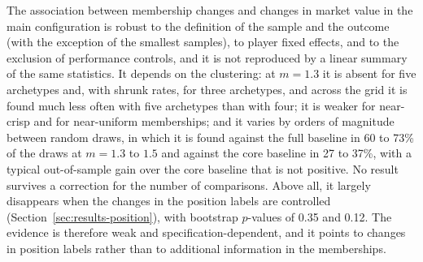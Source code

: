 The association between membership changes and changes in market value in the main configuration is robust to the definition of the sample and the outcome (with the exception of the smallest samples), to player fixed effects, and to the exclusion of performance controls, and it is not reproduced by a linear summary of the same statistics. It depends on the clustering: at $m=1.3$ it is absent for five archetypes and, with shrunk rates, for three archetypes, and across the grid it is found much less often with five archetypes than with four; it is weaker for near-crisp and for near-uniform memberships; and it varies by orders of magnitude between random draws, in which it is found against the full baseline in 60 to 73\% of the draws at $m=1.3$ to $1.5$ and against the core baseline in 27 to 37\%, with a typical out-of-sample gain over the core baseline that is not positive. No result survives a correction for the number of comparisons. Above all, it largely disappears when the changes in the position labels are controlled (Section~\ref{sec:results-position}), with bootstrap $p$-values of 0.35 and 0.12. The evidence is therefore weak and specification-dependent, and it points to changes in position labels rather than to additional information in the memberships.
